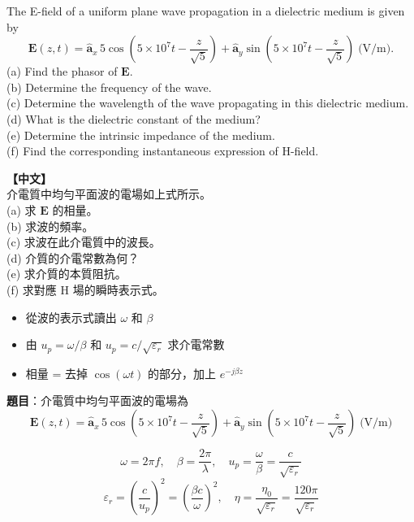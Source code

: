 \documentclass[12pt,a4paper]{article}
\newcommand{\vE}{\mathbf{E}}
\newcommand{\ax}{\hat{\mathbf{a}}_x}
\newcommand{\ay}{\hat{\mathbf{a}}_y}
\begin{document}
\begin{questionbox}
The E-field of a uniform plane wave propagation in a dielectric medium is given by
\[
  \vE(z,t) = \ax\,5\cos\!\left(5\times10^7 t - \frac{z}{\sqrt{5}}\right) + \ay\sin\!\left(5\times10^7 t - \frac{z}{\sqrt{5}}\right) \;\text{(V/m)}.
\]
(a) Find the phasor of $\vE$.\\
(b) Determine the frequency of the wave.\\
(c) Determine the wavelength of the wave propagating in this dielectric medium.\\
(d) What is the dielectric constant of the medium?\\
(e) Determine the intrinsic impedance of the medium.\\
(f) Find the corresponding instantaneous expression of H-field.

\medskip\noindent\textbf{【中文】}\\
介電質中均勻平面波的電場如上式所示。\\
(a) 求 $\vE$ 的相量。\\
(b) 求波的頻率。\\
(c) 求波在此介電質中的波長。\\
(d) 介質的介電常數為何？\\
(e) 求介質的本質阻抗。\\
(f) 求對應 H 場的瞬時表示式。
\end{questionbox}

\begin{conceptbox}[核心概念]
\begin{itemize}
  \item 從波的表示式讀出 $\omega$ 和 $\beta$
  \item 由 $u_p = \omega/\beta$ 和 $u_p = c/\sqrt{\varepsilon_r}$ 求介電常數
  \item 相量 = 去掉 $\cos(\omega t)$ 的部分，加上 $e^{-j\beta z}$
\end{itemize}
\end{conceptbox}

\textbf{題目}：介電質中均勻平面波的電場為
\[
  \vE(z,t) = \ax\,5\cos\!\left(5\times10^7 t - \frac{z}{\sqrt{5}}\right)
  + \ay\sin\!\left(5\times10^7 t - \frac{z}{\sqrt{5}}\right) \;\text{(V/m)}
\]

\begin{formulabox}[相關公式]
\[
  \omega = 2\pi f, \quad \beta = \frac{2\pi}{\lambda}, \quad u_p = \frac{\omega}{\beta} = \frac{c}{\sqrt{\varepsilon_r}}
\]
\[
  \varepsilon_r = \left(\frac{c}{u_p}\right)^2 = \left(\frac{\beta c}{\omega}\right)^2, \quad
  \eta = \frac{\eta_0}{\sqrt{\varepsilon_r}} = \frac{120\pi}{\sqrt{\varepsilon_r}}
\]
\end{formulabox}
\end{document}
